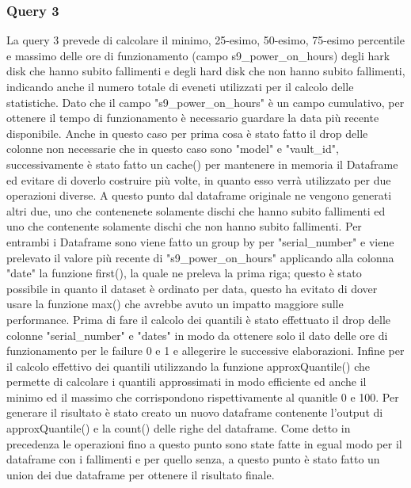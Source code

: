 \documentclass[conference]{IEEEtran}
\begin{document}
\subsubsection{Query 3}
La query 3 prevede di calcolare il minimo, 25-esimo, 50-esimo, 75-esimo percentile e massimo delle ore di funzionamento (campo s9\_power\_on\_hours) degli hark disk che hanno subito fallimenti e degli hard disk che non hanno subito fallimenti, indicando anche il numero totale di eveneti utilizzati per il calcolo delle statistiche.
Dato che il campo "s9\_power\_on\_hours" è un campo cumulativo, per ottenere il tempo di funzionamento è necessario guardare la data più recente disponibile.
Anche in questo caso per prima cosa è stato fatto il drop delle colonne non necessarie che in questo caso sono "model" e "vault\_id", successivamente è stato fatto un cache() per mantenere in memoria il Dataframe ed evitare di doverlo costruire più volte, in quanto esso verrà utilizzato per due operazioni diverse. A questo punto dal dataframe originale ne vengono generati altri due, uno che contenenete solamente dischi che hanno subito fallimenti ed uno che contenente solamente dischi che non hanno subito fallimenti. Per entrambi i Dataframe sono viene fatto un group by per "serial\_number" e viene prelevato il valore più recente di "s9\_power\_on\_hours" applicando alla colonna "date" la funzione first(), la quale ne preleva la prima riga; questo è stato possibile in quanto il dataset è ordinato per data, questo ha evitato di dover usare la funzione max() che avrebbe avuto un impatto maggiore sulle performance. Prima di fare il calcolo dei quantili è stato effettuato il drop delle colonne "serial\_number" e "dates" in modo da ottenere solo il dato delle ore di funzionamento per le failure 0 e 1 e allegerire le successive elaborazioni. Infine per il calcolo effettivo dei quantili utilizzando la funzione approxQuantile() che permette di calcolare i quantili approssimati in modo efficiente ed anche il minimo ed il massimo che corrispondono rispettivamente al quanitle 0 e 100. Per generare il risultato è stato creato un nuovo dataframe contenente l'output di approxQuantile() e la count() delle righe del dataframe. Come detto in precedenza le operazioni fino a questo punto sono state fatte in egual modo per il dataframe con i fallimenti e per quello senza, a questo punto è stato fatto un union dei due dataframe per ottenere il risultato finale.  
\end{document}
